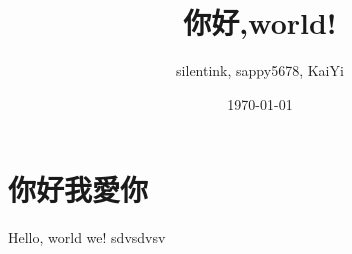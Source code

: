 \documentclass{article}
\title{你好,world!}
\author{silentink, sappy5678, KaiYi}
\date{\today}
\begin{document}
\maketitle
\section{你好我愛你}
Hello, world we!
sdvsdvsv
\end{document}
